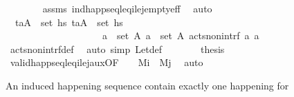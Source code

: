 \begin{isabellebody}
\ \ \ \ \ \ \isamarkupfalse%
\ assms\ ind{\isacharunderscore}{\kern0pt}happ{\isacharunderscore}{\kern0pt}seq{\isacharunderscore}{\kern0pt}leq\isactrlsub i{\isacharunderscore}{\kern0pt}le\isactrlsub j{\isacharunderscore}{\kern0pt}empty{\isacharunderscore}{\kern0pt}eff\ \isamarkupfalse%
\ auto\isanewline
\ \ \ \ \isamarkupfalse%
\ \isamarkupfalse%
\ {}{\isacharcolon}{\kern0pt}\ {\isachardoublequoteopen}{\isasymforall}{\isacharparenleft}{\kern0pt}t\isactrlsub a{\isacharcomma}{\kern0pt}A{\isacharparenright}{\kern0pt}\ {\isasymin}\ set\ {\isacharquery}{\kern0pt}hs\ {\isasymforall}{\isacharparenleft}{\kern0pt}t\isactrlsub a{\isacharprime}{\kern0pt}{\isacharcomma}{\kern0pt}A{\isacharprime}{\kern0pt}{\isacharparenright}{\kern0pt}\ {\isasymin}\ set\ {\isacharquery}{\kern0pt}hs\ \isanewline
\ \ \ \ \ \ \ \ \ \ \ \ \ \ \ \ \ \ \ \ {\isasymforall}a\ {\isasymin}\ set\ A{\isachardot}{\kern0pt}\ {\isasymforall}a{\isacharprime}{\kern0pt}\ {\isasymin}\ set\ A{\isacharprime}{\kern0pt}{\isachardot}{\kern0pt}\ acts{\isacharunderscore}{\kern0pt}non{\isacharunderscore}{\kern0pt}intrf\ a\ a{\isacharprime}{\kern0pt}{\isachardoublequoteclose}\isanewline
\ \ \ \ \ \ \isamarkupfalse%
\ acts{\isacharunderscore}{\kern0pt}non{\isacharunderscore}{\kern0pt}intrf{\isacharunderscore}{\kern0pt}def\ \isamarkupfalse%
\ {\isacharparenleft}{\kern0pt}auto\ simp{\isacharcolon}{\kern0pt}\ Let{\isacharunderscore}{\kern0pt}def{\isacharparenright}{\kern0pt}\isanewline
\ \ \ \ \isamarkupfalse%
\ \isamarkupfalse%
\ {\isacharquery}{\kern0pt}thesis\isanewline
\ \ \ \ \ \ \isamarkupfalse%
\ valid{\isacharunderscore}{\kern0pt}happ{\isacharunderscore}{\kern0pt}seq{\isacharunderscore}{\kern0pt}leq\isactrlsub i{\isacharunderscore}{\kern0pt}le\isactrlsub j{\isacharunderscore}{\kern0pt}aux{}{\isacharbrackleft}{\kern0pt}OF\ {}\ {}\ {}{\isacharbrackright}{\kern0pt}\ {\isacartoucheopen}M\isactrlsub i\ {\isacharequal}{\kern0pt}\ M\isactrlsub j{\isacartoucheclose}\ \isamarkupfalse%
\ auto\isanewline
\ \ \isamarkupfalse%
%
\endisatagproof
{\isafoldproof}%
%
\isadelimproof
%
\endisadelimproof
%
\begin{isamarkuptext}%
An induced happening sequence contain exactly one happening for 

\end{isamarkuptext}
\end{isabellebody}
